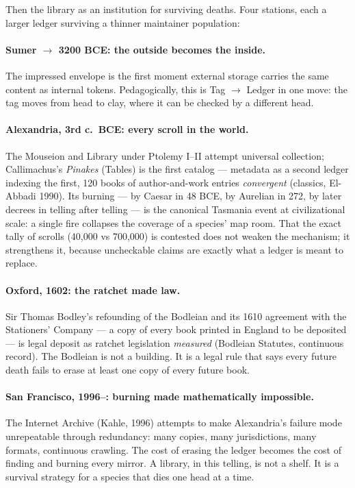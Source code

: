 Then the library as an institution for surviving deaths. Four stations, each a larger ledger surviving a thinner maintainer population:

\paragraph{Sumer $\to$ 3200 BCE: the outside becomes the inside.} The impressed envelope is the first moment external storage carries the same content as internal tokens. Pedagogically, this is Tag $\to$ Ledger in one move: the tag moves from head to clay, where it can be checked by a different head.

\paragraph{Alexandria, 3rd c.\ BCE: every scroll in the world.} The Mouseion and Library under Ptolemy I--II attempt universal collection; Callimachus's \textit{Pinakes} (Tables) is the first catalog --- metadata as a second ledger indexing the first, 120 books of author-and-work entries \textit{convergent} (classics, El-Abbadi 1990). Its burning --- by Caesar in 48 BCE, by Aurelian in 272, by later decrees in telling after telling --- is the canonical Tasmania event at civilizational scale: a single fire collapses the coverage of a species' map room. That the exact tally of scrolls (40,000 vs 700,000) is contested does not weaken the mechanism; it strengthens it, because uncheckable claims are exactly what a ledger is meant to replace.

\paragraph{Oxford, 1602: the ratchet made law.} Sir Thomas Bodley's refounding of the Bodleian and its 1610 agreement with the Stationers' Company --- a copy of every book printed in England to be deposited --- is legal deposit as ratchet legislation \textit{measured} (Bodleian Statutes, continuous record). The Bodleian is not a building. It is a legal rule that says every future death fails to erase at least one copy of every future book.

\paragraph{San Francisco, 1996--: burning made mathematically impossible.} The Internet Archive (Kahle, 1996) attempts to make Alexandria's failure mode unrepeatable through redundancy: many copies, many jurisdictions, many formats, continuous crawling. The cost of erasing the ledger becomes the cost of finding and burning every mirror. A library, in this telling, is not a shelf. It is a survival strategy for a species that dies one head at a time.

